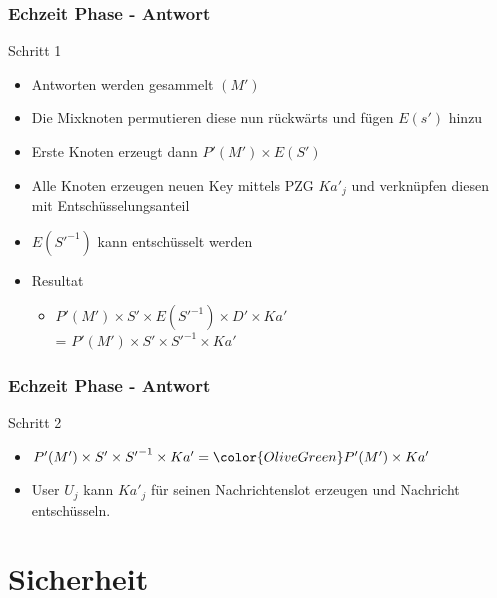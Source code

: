 \documentclass[t, xcolor=dvipsnames]{beamer}
\begin{document}
\begin{frame}
	\frametitle{Echzeit Phase - Antwort}
	
	Schritt 1
	\begin{itemize}
		\item Antworten werden gesammelt $(M')$
		
		\item Die Mixknoten permutieren diese nun rückwärts und fügen $E(s')$ hinzu
		\item Erste Knoten erzeugt dann $P'(M') \times E(S')$
		\item Alle Knoten erzeugen neuen Key mittels PZG $Ka'_j$ und verknüpfen diesen mit Entschüsselungsanteil
		\item  $E({S'}^{-1})$ kann entschüsselt werden
		\item Resultat
		\begin{itemize}
		\item $P'(M') \times S' \times E({S'}^{-1}) \times D' \times Ka'$\\
			= $P'(M') \times S' \times {S'}^{-1} \times Ka'$

		\end{itemize}
	\end{itemize}
			
	\vspace{\fill}
\end{frame}


\begin{frame}
	\frametitle{Echzeit Phase - Antwort}
	
	Schritt 2
	\begin{itemize}
		
		\item   $P'(M') \times S' \times {S'}^{-1} \times Ka' =  \color{OliveGreen}P'(M') \times Ka'$

		\item User $U_j$ kann $Ka'_j$ für seinen Nachrichtenslot erzeugen und Nachricht entschüsseln.
		\end{itemize}

			
	\vspace{\fill}
\end{frame}


\section{Sicherheit}
\end{document}
